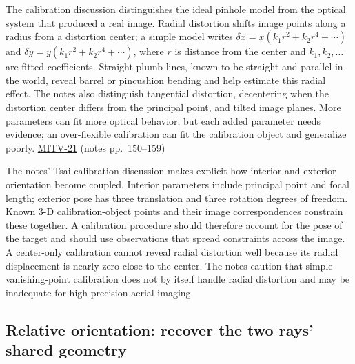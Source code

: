 The calibration discussion distinguishes the ideal pinhole model from the optical system that produced a real image. Radial distortion shifts image points along a radius from a distortion center; a simple model writes \(\delta x=x(k_1r^2+k_2r^4+\cdots)\) and \(\delta y=y(k_1r^2+k_2r^4+\cdots)\), where \(r\) is distance from the center and \(k_1,k_2,\ldots\) are fitted coefficients. Straight plumb lines, known to be straight and parallel in the world, reveal barrel or pincushion bending and help estimate this radial effect. The notes also distinguish tangential distortion, decentering when the distortion center differs from the principal point, and tilted image planes. More parameters can fit more optical behavior, but each added parameter needs evidence; an over-flexible calibration can fit the calibration object and generalize poorly. \hyperref[04-visual-computing-ii-ch036-mitv-21---relative-orientation-binocular-stereo-structure-quadrics-calibration-reprojection]{MITV-21} (notes pp.~150--159)

The notes' Tsai calibration discussion makes explicit how interior and exterior orientation become coupled. Interior parameters include principal point and focal length; exterior pose has three translation and three rotation degrees of freedom. Known 3-D calibration-object points and their image correspondences constrain these together. A calibration procedure should therefore account for the pose of the target and should use observations that spread constraints across the image. A center-only calibration cannot reveal radial distortion well because its radial displacement is nearly zero close to the center. The notes caution that simple vanishing-point calibration does not by itself handle radial distortion and may be inadequate for high-precision aerial imaging.

\subsection{Relative orientation: recover the two rays' shared geometry}\label{04-visual-computing-ii-ch032-relative-orientation-recover-the-two-rays-shared-geometry}

\hypertarget{04-visual-computing-ii-ch032-relative-orientation-recover-the-two-rays-shared-geometry}{}

